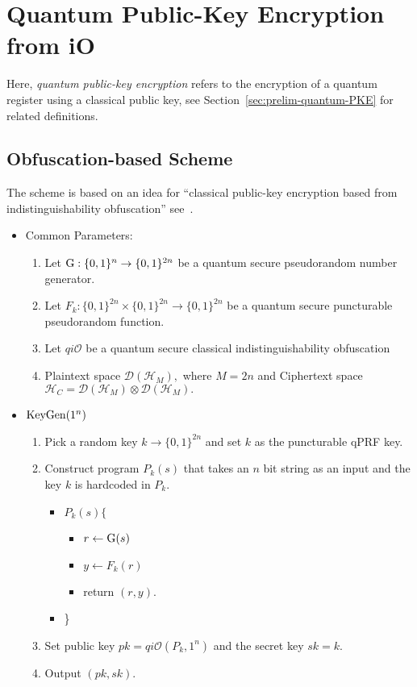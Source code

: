 \section{Quantum Public-Key Encryption from iO}
\label{sec:Quantum-public-key}
Here, \emph{quantum public-key encryption} refers to the  encryption of a quantum register using a classical public key, see Section~\ref{sec:prelim-quantum-PKE} for related definitions.


\subsection{Obfuscation-based Scheme}
The scheme is based on an idea for ``classical public-key encryption based from indistinguishability obfuscation'' see~\cite{SW14}.
\label{sec:obfuscation}
\begin{itemize}
\item Common Parameters:
\begin{enumerate}
\item Let  ${\rm G}: \{0,1\}^n\rightarrow \{0,1\}^{2n}$ be a quantum secure pseudorandom number generator.
\item Let  $F_k:\{0,1\}^{2n} \times \{0,1\}^{2n} \longrightarrow \{0,1\}^{2n}$ be a quantum secure puncturable pseudorandom function.
\item Let $qi\mathcal{O}$ be a quantum secure classical indistinguishability obfuscation
\item Plaintext space  $\mathcal{D}(\mathcal{H}_{M}),$ where $M=2n$ and Ciphertext space $\mathcal{H}_C=\mathcal{D}(\mathcal{H}_{M})\otimes \mathcal{D}(\mathcal{H}_{M}).$
\end{enumerate}
\end{itemize}

\begin{itemize}
\item ${\rm KeyGen}(1^n)$
\begin{enumerate}
\item  Pick a random key $k\rightarrow \{0,1\}^{2n}$ and set $k$ as the puncturable qPRF key.
\item Construct  program $P_k(s)$ that takes an $n$ bit string as an input and the key $k$ is hardcoded in $P_k.$
\begin{itemize}
\item[] $P_k(s) \{$
\begin{itemize}
\item[] $r\leftarrow {\rm G}(s)$
\item[] $y \leftarrow F_k(r)$
\item[] return $(r,y).$
\end{itemize}
\item[] \}
\end{itemize}
\item Set public key $pk=qi\mathcal{O}(P_k,1^n)$ and the secret key $sk=k.$
\item Output $(pk,sk).$
\end{enumerate}
\end{itemize}


